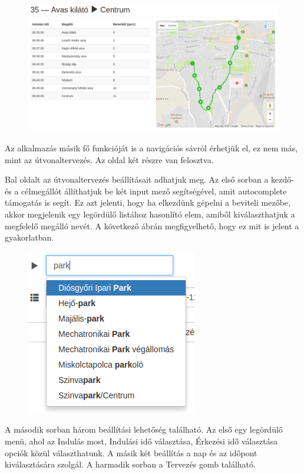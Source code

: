 \begin{figure}[htb]
\centering
\includegraphics[scale=0.35]{kepek/trip_tablazat_es_terkep.png}
\caption{}
\label{fig:trip_tablazat_es_terkep}
\end{figure}

Az alkalmazás másik fő funkcióját is a navigációs sávról érhetjük el, ez nem más, mint az útvonaltervezés. Az oldal két részre van felosztva.

Bal oldalt az útvonaltervezés beállításait adhatjuk meg. Az első sorban a kezdő- és a célmegállót állíthatjuk be két input mező segítségével, amit autocomplete támogatás is segít. Ez azt jelenti, hogy ha elkezdünk gépelni a beviteli mezőbe, akkor megjelenik egy legördülő listához hasonlító elem, amiből kiválaszthatjuk a megfelelő megálló nevét. A következő ábrán megfigyelhető, hogy ez mit is jelent a gyakorlatban.

\begin{figure}[htb]
\centering
\includegraphics[scale=0.6]{kepek/autocomplete.png}
\caption{}
\label{fig:autocomplete}
\end{figure}

A második sorban három beállítási lehetőség található. Az első egy legördülő menü, ahol az Indulás most, Indulási idő választása, Érkezési idő választása opciók közül választhatunk. A másik két beállítás a nap és az időpont kiválasztására szolgál. A harmadik sorban a Tervezés gomb található.

